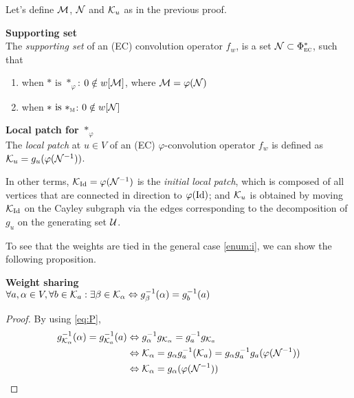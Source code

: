 Let's define $\mathcal{M}$, $\mathcal{N}$ and $\mathcal{K}_u$ as in the previous proof.
\begin{definition}\textbf{Supporting set}\\
The \emph{supporting set} of an (EC) convolution operator $f_w$, is a set $\mathcal{N} \subset \Phi^*_{\operatorname{\textsc{ec}}}$, such that
\begin{enumerate}[label=(\roman*)]
  \item when $\ast \text{ is } \ast_\varphi$: $0 \notin w[\mathcal{M}]$, where $\mathcal{M}= \varphi(\mathcal{N})$ \label{enum:i}
  \item when $\ast \text{ is } \ast_{\operatorname{\textsc{m}}}$: $0 \notin w[\mathcal{N}]$ \label{enum:ii}
\end{enumerate}
\end{definition}

\begin{definition}\textbf{Local patch for $\ast_\varphi$}\\
The \emph{local patch} at $u \in V$ of an (EC) $\varphi$-convolution operator $f_w$ is defined as $\mathcal{K}_u = g_u(\varphi(\mathcal{N}^{-1}))$.
\end{definition}

\begin{remark}
In other terms, $\mathcal{K}_{\operatorname{Id}} = \varphi(\mathcal{N}^{-1})$ is the \emph{initial local patch}, which is composed of all vertices that are connected in direction to $\varphi(\operatorname{Id})$; and $\mathcal{K}_u$ is obtained by moving $\mathcal{K}_{\operatorname{Id}} $ on the Cayley subgraph via the edges corresponding to the decomposition of $g_u$ on the generating set $\mathcal{U}$.
\end{remark}

To see that the weights are tied in the general case \ref{enum:i}, we can show the following proposition.

\begin{proposition}\textbf{Weight sharing}\\
$\forall a, \alpha \in V, \forall b \in \mathcal{K}_a: \exists \beta \in \mathcal{K}_{\alpha} \Leftrightarrow g_{\beta}^{-1}(\alpha) = g_{b}^{-1}(a)$
\end{proposition}
\begin{proof}
By using \eqref{eq:P},
\begin{align*}
g_{\mathcal{K}_\alpha}^{-1}(\alpha) = g_{\mathcal{K}_a}^{-1}(a)
	& \Leftrightarrow  g_{\alpha}^{-1}g_{\mathcal{K}_{\alpha}} = g_a^{-1}g_{\mathcal{K}_a}\\
	& \Leftrightarrow  \mathcal{K}_{\alpha} = g_{\alpha}g_a^{-1}(\mathcal{K}_a) = g_{\alpha}g_a^{-1}g_a(\varphi(\mathcal{N}^{-1}))\\
	& \Leftrightarrow  \mathcal{K}_{\alpha} = g_{\alpha}(\varphi(\mathcal{N}^{-1}))
\end{align*}
\end{proof}


